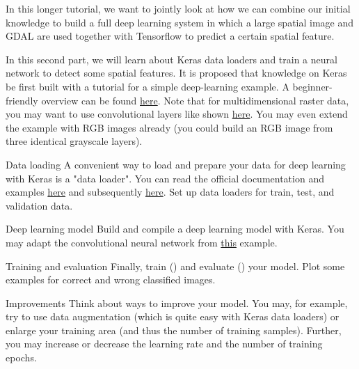\documentclass[twoside]{article}
\begin{document}
\maketitle

\vspace{10pt}

In this longer tutorial, we want to jointly look at how we can combine our initial knowledge to build a full deep learning system in which a large spatial image and GDAL are used together with Tensorflow to predict a certain spatial feature.

\vspace{10pt}

In this second part, we will learn about Keras data loaders and train a neural network to detect some spatial features.
It is proposed that knowledge on Keras be first built with a tutorial for a simple deep-learning example. 
A beginner-friendly overview can be found \href{https://www.tensorflow.org/tutorials/keras/classification}{here}.
Note that for multidimensional raster data, you may want to use convolutional layers like shown \href{https://keras.io/examples/vision/mnist_convnet/}{here}.
You may even extend the example with RGB images already (you could build an RGB image from three identical grayscale layers).


\begin{task}{Data loading}{}{}
A convenient way to load and prepare your data for deep learning with Keras is a "data loader".
You can read the official documentation and examples \href{https://keras.io/api/data_loading/}{here} and subsequently \href{https://keras.io/api/data_loading/image/}{here}.
Set up data loaders for train, test, and validation data.
\end{task}

\begin{task}{Deep learning model}{}{}
Build and compile a deep learning model with Keras.
You may adapt the convolutional neural network from \href{https://keras.io/examples/vision/mnist_convnet/}{this} example.
\end{task}

\begin{task}{Training and evaluation}{}{}
Finally, train () and evaluate () your model.
Plot some examples for correct and wrong classified images.
\end{task}

\clearpage

\begin{task}{Improvements}{}{}
Think about ways to improve your model.
You may, for example, try to use data augmentation (which is quite easy with Keras data loaders) or enlarge your training area (and thus the number of training samples).
Further, you may increase or decrease the learning rate and the number of training epochs.

\end{task}
\end{document}
